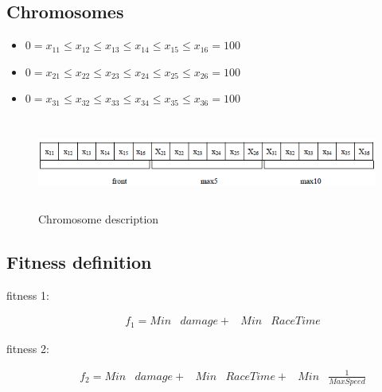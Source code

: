 \documentclass[runningheads,a4paper]{llncs}
\begin{document}
\subsection{Chromosomes}
\begin{itemize}
	\item []$0 = x_{11} \leq x_{12} \leq x_{13} \leq x_{14} \leq x_{15} \leq x_{16} = 100$
	\item []$0 = x_{21} \leq x_{22} \leq x_{23} \leq x_{24} \leq x_{25} \leq x_{26} = 100$
	\item []$0 = x_{31} \leq x_{32} \leq x_{33} \leq x_{34} \leq x_{35} \leq x_{36} = 100$
\end{itemize}
\begin{figure}[!ht]	
	\begin{center}
		\includegraphics[width=13cm,height=3cm]{fig/cromosome}
		\caption{Chromosome description}
		\label{cromosome}	
	\end{center}	
\end{figure}
\subsection{Fitness definition}

\begin{description}
	\item[fitness 1:]  
	\begin{equation} \label{fit1}
	\begin{array}{lllll}
	f_{1} =  Min & damage + & Min & RaceTime 
	\end{array}
	\end{equation}
	\item[fitness 2:] 
	\begin{equation} \label{fit2}
	\begin{array}{llllll}
	f_{2}= Min & damage + & Min & RaceTime+ & Min & \frac{1}{MaxSpeed}
	\end{array}
	\end{equation}	
\end{description}
\end{document}
